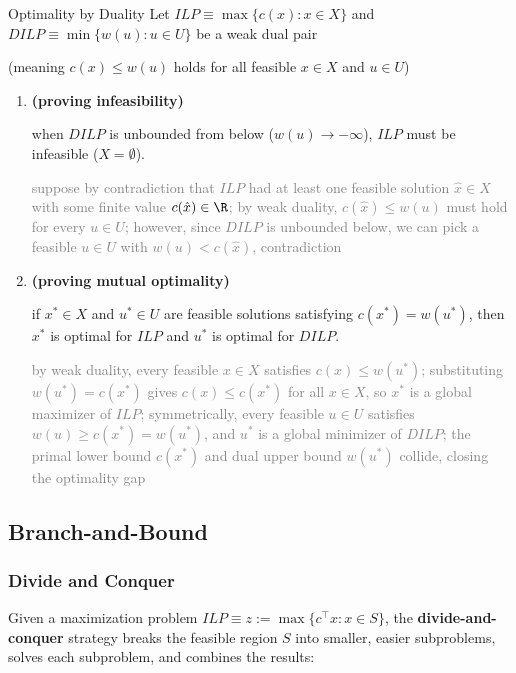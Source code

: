 \documentclass[a4paper, 11pt]{report}
\begin{document}
\begin{thmframe}{Optimality by Duality}{}
Let $ILP \equiv \max \{ c(x) : x \in X \}$ and $DILP \equiv \min \{ w(u) : u \in U \}$ be a weak dual pair 

(meaning $c(x) \leq w(u)$ holds for all feasible $x \in X$ and $u \in U$)
\begin{enumerate}
    \item \textbf{(proving infeasibility)} 

        when $DILP$ is unbounded from below ($w(u) \to -\infty$), $ILP$ must be infeasible ($X = \emptyset$).
    
        \textcolor{gray}{suppose by contradiction that $ILP$ had at least one feasible solution $\hat{x} \in X$ with some finite value $c(\hat{x}) \in \R$; by weak duality, $c(\hat{x}) \leq w(u)$ must hold for every $u \in U$; however, since $DILP$ is unbounded below, we can pick a feasible $u \in U$ with $w(u) < c(\hat{x})$, contradiction}

    \item \textbf{(proving mutual optimality)}

        if $x^* \in X$ and $u^* \in U$ are feasible solutions satisfying $c(x^*) = w(u^*)$, then $x^*$ is optimal for $ILP$ and $u^*$ is optimal for $DILP$.
    
    \textcolor{gray}{by weak duality, every feasible $x \in X$ satisfies $c(x) \leq w(u^*)$; substituting $w(u^*) = c(x^*)$ gives $c(x) \leq c(x^*)$ for all $x \in X$, so $x^*$ is a global maximizer of $ILP$; symmetrically, every feasible $u \in U$ satisfies $w(u) \geq c(x^*) = w(u^*)$, and $u^*$ is a global minimizer of $DILP$; the primal lower bound $c(x^*)$ and dual upper bound $w(u^*)$ collide, closing the optimality gap}
\end{enumerate}
\end{thmframe}

\subsection{Branch-and-Bound}

\subsubsection{Divide and Conquer}
Given a maximization problem $ILP \equiv z := \max \{ c^\top x : x \in S \}$, the \textbf{divide-and-conquer} strategy breaks the feasible region $S$ into smaller, easier subproblems, solves each subproblem, and combines the results:
\end{document}
